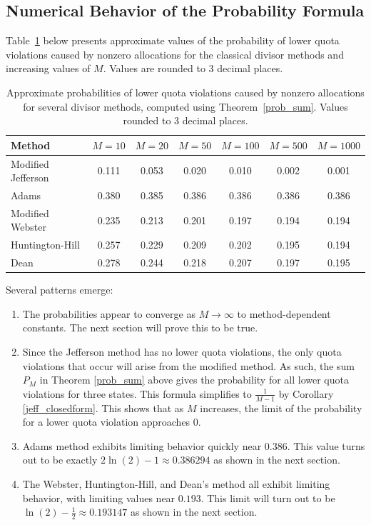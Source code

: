 \documentclass[11pt]{article}
\theoremstyle{definition}
\theoremstyle{definition}
\begin{document}
\subsection{Numerical Behavior of the Probability Formula}
Table~\ref{tab:probabilities} below presents approximate values of the probability of lower quota violations caused by nonzero allocations for the classical divisor methods and increasing values of $M$. Values are rounded to 3 decimal places. 

\begin{table}[H]
\centering
\begin{tabular}{lcccccc}
\toprule
Method & $M=10$ & $M=20$ & $M=50$ & $M=100$ & $M=500$ & $M = 1000$\\
\midrule
Modified Jefferson & 0.111 & 0.053 & 0.020 & 0.010 & 0.002 & 0.001\\
Adams & 0.380 & 0.385 & 0.386 & 0.386 & 0.386 & 0.386\\
Modified Webster & 0.235 & 0.213 & 0.201 & 0.197 & 0.194 & 0.194\\ 
Huntington-Hill & 0.257 & 0.229 & 0.209 & 0.202 & 0.195 & 0.194 \\
Dean & 0.278 & 0.244 & 0.218 & 0.207 & 0.197 & 0.195\\
\bottomrule
\end{tabular}
\caption{Approximate probabilities of lower quota violations caused by nonzero allocations for several divisor methods, computed using Theorem~\ref{prob_sum}. Values rounded to 3 decimal places.}
\label{tab:probabilities}
\end{table}

Several patterns emerge:
\begin{enumerate}
 \item The probabilities appear to converge as $M \to \infty$ to method-dependent constants. The next section will prove this to be true.  
 
 \item Since the Jefferson method has no lower quota violations, the only quota violations that occur will arise from the modified method. As such, the sum $P_M$ in Theorem \ref{prob_sum} above gives the probability for all lower quota violations for three states. This formula simplifies to $\frac{1}{M-1}$ by Corollary \ref{jeff_closedform}. This shows that as $M$ increases, the limit of the probability for a lower quota violation approaches 0. 
 

 \item Adams method exhibits limiting behavior quickly near 0.386. This value turns out to be exactly $2\ln(2) -1 \approx 0.386294$ as shown in the next section. 
 
 \item The Webster, Huntington-Hill, and Dean's method all exhibit limiting behavior, with limiting values near $0.193$. This limit will turn out to be $\ln(2) - \tfrac12 \approx 0.193147$ as shown in the next section. 
 \end{enumerate}
\end{document}
